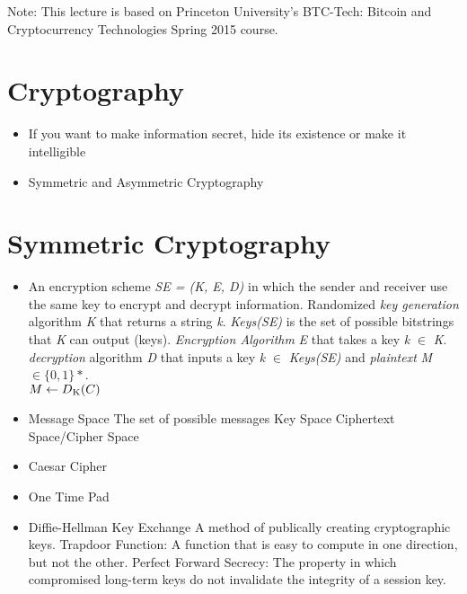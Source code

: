 \documentclass{article}
\begin{document}
\maketitle

Note: This lecture is based on Princeton University's BTC-Tech: Bitcoin and Cryptocurrency Technologies Spring 2015 course.

\section*{Cryptography}
\begin{itemize}
  \item If you want to make information secret, hide its existence or make it intelligible
  \item Symmetric and Asymmetric Cryptography
\end{itemize}

\section*{Symmetric Cryptography}
\begin{itemize}
  \item An encryption scheme \emph{SE = (K, E, D)} in which the sender and receiver use the same key to encrypt and decrypt information.
    \subitem Randomized \emph{key generation} algorithm \emph{K} that returns a string \emph{k}. \emph{Keys(SE)}  is the set of possible bitstrings that \emph{K} can output (keys).
    \subitem \emph{Encryption Algorithm}  \emph{E} that takes a key \emph{k} $ \in $ \emph{K}.
    \subitem \emph{decryption} algorithm \emph{D} that inputs a key \emph{k} $ \in $ \emph{Keys(SE)} and
    \emph{plaintext} \emph{M} $ \in  \{0, 1\}* $.\\ 
    $ M \gets D\textsubscript{K}(C) $
  \item Message Space
    \subitem The set of possible messages
    \subitem Key Space
    \subitem Ciphertext Space/Cipher Space
  \item Caesar Cipher
  \item One Time Pad
  \item Diffie-Hellman Key Exchange
    \subitem A method of publically creating cryptographic keys.
    \subitem Trapdoor Function: A function that is easy to compute in one direction, but not the other.
    \subitem Perfect Forward Secrecy: The property in which compromised long-term keys do not invalidate the 
    integrity of a session key.
\end{itemize}
\end{document}
